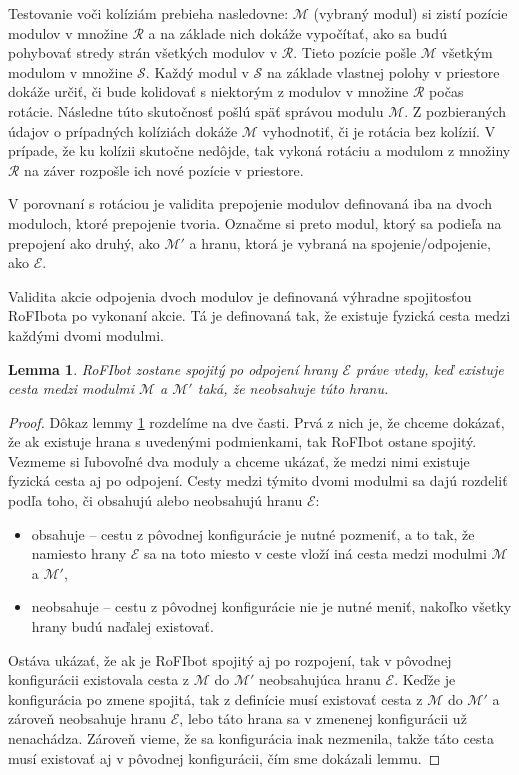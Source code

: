 \documentclass[
  digital, %
  oneside, %
  notable,   %
  lof,     %
  nolot,     %
]{fithesis3}
\newtheorem{lemma}{Lemma}
\begin{document}
Testovanie voči kolíziám prebieha nasledovne: $\mathcal{M}$ (vybraný modul) si zistí pozície modulov v množine $\mathcal{R}$ a na základe nich dokáže vypočítať, ako sa budú pohybovať stredy strán všetkých modulov v $\mathcal{R}$. Tieto pozície pošle $\mathcal{M}$ všetkým modulom v množine $\mathcal{S}$. Každý modul v $\mathcal{S}$ na základe vlastnej polohy v priestore dokáže určiť, či bude kolidovať s niektorým z modulov v množine $\mathcal{R}$ počas rotácie. Následne túto skutočnosť pošlú späť správou modulu $\mathcal{M}$. Z pozbieraných údajov o prípadných kolíziách dokáže $\mathcal{M}$ vyhodnotiť, či je rotácia bez kolízií. V prípade, že ku kolízii skutočne nedôjde, tak vykoná rotáciu a modulom z množiny $\mathcal{R}$ na záver rozpošle ich nové pozície v priestore. 

V porovnaní s rotáciou je validita prepojenie modulov definovaná iba na dvoch moduloch, ktoré prepojenie tvoria. Označme si preto modul, ktorý sa podieľa na prepojení ako druhý, ako $\mathcal{M}'$ a hranu, ktorá je vybraná na spojenie/odpojenie, ako $\mathcal{E}$. 

Validita akcie odpojenia dvoch modulov je definovaná výhradne spojitosťou RoFIbota po vykonaní akcie. Tá je definovaná tak, že existuje fyzická cesta medzi každými dvomi modulmi. 

\begin{lemma}
\label{lemma:disconnection}
RoFIbot zostane spojitý po odpojení hrany $\mathcal{E}$ práve vtedy, keď existuje cesta medzi modulmi $\mathcal{M}$ a $\mathcal{M}'$ taká, že neobsahuje túto hranu. 
\end{lemma}

\begin{proof}
Dôkaz lemmy \ref{lemma:disconnection} rozdelíme na dve časti. Prvá z nich je, že chceme dokázať, že ak existuje hrana s uvedenými podmienkami, tak RoFIbot ostane spojitý. Vezmeme si ľubovoľné dva moduly a chceme ukázať, že medzi nimi existuje fyzická cesta aj po odpojení. Cesty medzi týmito dvomi modulmi sa dajú rozdeliť podľa toho, či obsahujú alebo neobsahujú hranu $\mathcal{E}$: 
\begin{itemize}
    \item obsahuje -- cestu z pôvodnej konfigurácie je nutné pozmeniť, a to tak, že namiesto hrany $\mathcal{E}$ sa na toto miesto v ceste vloží iná cesta medzi modulmi $\mathcal{M}$ a $\mathcal{M}'$, 
    \item neobsahuje -- cestu z pôvodnej konfigurácie nie je nutné meniť, nakoľko všetky hrany budú naďalej existovať.
\end{itemize}

Ostáva ukázať, že ak je RoFIbot spojitý aj po rozpojení, tak v pôvodnej konfigurácii existovala cesta z $\mathcal{M}$ do $\mathcal{M}'$ neobsahujúca hranu $\mathcal{E}$. Keďže je konfigurácia po zmene spojitá, tak z definície musí existovať cesta z $\mathcal{M}$ do $\mathcal{M}'$ a zároveň neobsahuje hranu $\mathcal{E}$, lebo táto hrana sa v zmenenej konfigurácii už nenachádza. Zároveň vieme, že sa konfigurácia inak nezmenila, takže táto cesta musí existovať aj v pôvodnej konfigurácii, čím sme dokázali lemmu. 

\end{proof}
\end{document}
